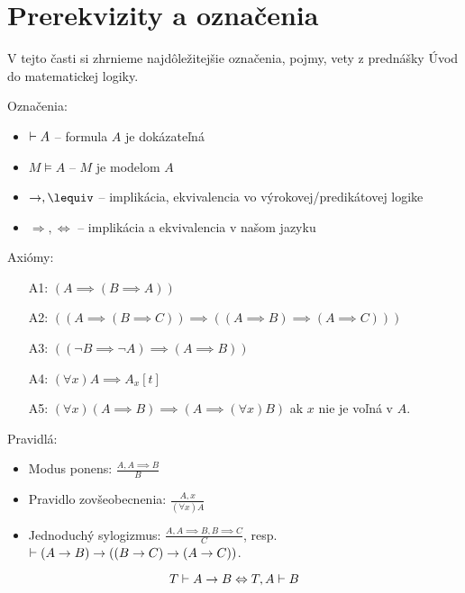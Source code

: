 \section{Prerekvizity a označenia}

V tejto časti si zhrnieme najdôležitejšie označenia, pojmy, vety z
prednášky Úvod do matematickej logiky.

\noindent Označenia:
\begin{itemize}
    \item $\vdash A$ -- formula $A$ je dokázateľná
    \item $M \models A$ -- $M$ je modelom $A$
    \item $\implies, \lequiv$ -- implikácia, ekvivalencia vo
    výrokovej/predikátovej logike
    \item $\Rightarrow, \Leftrightarrow$ -- implikácia a ekvivalencia v
    našom jazyku
\end{itemize}

\noindent Axiómy:
\begin{itemize}
    \item[A1:] $(A \implies (B \implies A))$
    \item[A2:] $((A \implies (B \implies C)) \implies 
                ((A \implies B) \implies (A \implies C)))$
    \item[A3:] $((\neg B \implies \neg A) \implies (A \implies B))$
    \vskip 0.5cm
    \item[A4:] $(\forall x) A \implies A_x[t]$
    \item[A5:] $(\forall x) (A \implies B) \implies (A \implies
    (\forall x) B)$ ak $x$ nie je voľná v $A$.
\end{itemize}

\noindent Pravidlá:
\begin{itemize}
    \item Modus ponens: $\displaystyle \frac{A,A\implies B}{B}$
    \item Pravidlo zovšeobecnenia:
            $\displaystyle \frac{A,x}{(\forall x)A}$
    \item Jednoduchý sylogizmus:
            $\displaystyle \frac{A, A\implies B, B\implies C}{C}$, resp.
            $\vdash (A \rightarrow B) \rightarrow ((B \rightarrow C) 
                \rightarrow (A \rightarrow C))$.
\end{itemize}

\begin{veta}[O dedukcii]
    \begin{equation*}
        T \vdash A \rightarrow B \Leftrightarrow T,A \vdash B
    \end{equation*}
\end{veta}

